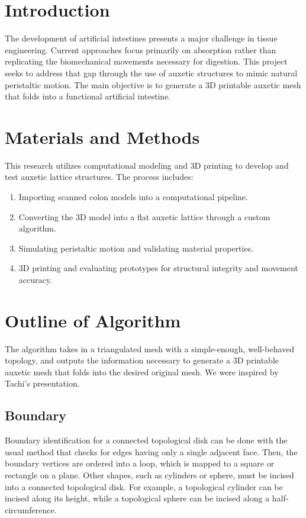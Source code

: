 \documentclass{article}
\begin{document}
\pagebreak

\section{Introduction}
The development of artificial intestines presents a major challenge in tissue
engineering. Current approaches focus primarily on absorption rather than
replicating the biomechanical movements necessary for digestion. This project
seeks to address that gap through the use of auxetic structures to mimic natural
peristaltic motion. The main objective is to generate a 3D printable auxetic
mesh that folds into a functional artificial intestine.

\section{Materials and Methods}
This research utilizes computational modeling and 3D printing to develop and
test auxetic lattice structures. The process includes:
\begin{enumerate}
  \item Importing scanned colon models into a computational pipeline.
  \item Converting the 3D model into a flat auxetic lattice through a custom algorithm.
  \item Simulating peristaltic motion and validating material properties.
  \item 3D printing and evaluating prototypes for structural integrity and movement accuracy.
\end{enumerate}

\section{Outline of Algorithm}
The algorithm takes in a triangulated mesh with a simple-enough, well-behaved topology, and outputs the information necessary to generate a 3D printable auxetic mesh that folds into the desired original mesh. We were inspired by Tachi's presentation. \cite{tachi}

\subsection{Boundary}
Boundary identification for a connected topological disk can be done with the usual method that checks for edges having only a single adjacent face. Then, the boundary vertices are ordered into a loop, which is mapped to a square or rectangle on a plane. Other shapes, such as cylinders or sphere, must be incised into a connected topological disk. For example, a topological cylinder can be incised along its height, while a topological sphere can be incised along a half-circumference.
\end{document}
